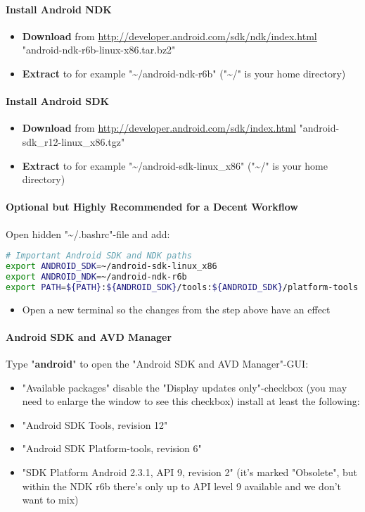 \paragraph{Install Android NDK}
\begin{itemize}
\item{\textbf{Download} from \url{http://developer.android.com/sdk/ndk/index.html} \textrightarrow  "android-ndk-r6b-linux-x86.tar.bz2"}
\item{\textbf{Extract} to for example "\textasciitilde /android-ndk-r6b" ("\textasciitilde /" is your home directory)}
\end{itemize}



\paragraph{Install Android SDK}
\begin{itemize}
\item{\textbf{Download} from \url{http://developer.android.com/sdk/index.html} \textrightarrow  "android-sdk\_r12-linux\_x86.tgz"}
\item{\textbf{Extract} to for example "\textasciitilde /android-sdk-linux\_x86" ("\textasciitilde /" is your home directory)}
\end{itemize}


\paragraph{Optional but Highly Recommended for a Decent Workflow}
Open hidden "\textasciitilde /.bashrc"-file and add:
\begin{lstlisting}[language=bash]
# Important Android SDK and NDK paths
export ANDROID_SDK=~/android-sdk-linux_x86
export ANDROID_NDK=~/android-ndk-r6b
export PATH=${PATH}:${ANDROID_SDK}/tools:${ANDROID_SDK}/platform-tools:~/${ANDROID_NDK}
\end{lstlisting}
\begin{itemize}
\item{Open a new terminal so the changes from the step above have an effect}
\end{itemize}


\paragraph{Android SDK and AVD Manager}
Type "\textbf{android}" to open the "Android SDK and AVD Manager"-GUI:
\begin{itemize}
\item{"Available packages" \textrightarrow  disable the "Display updates only"-checkbox (you may need to enlarge the window to see this checkbox) \textrightarrow  install at least the following:}
\item{"Android SDK Tools, revision 12"}
\item{"Android SDK Platform-tools, revision 6"}
\item{"SDK Platform Android 2.3.1, API 9, revision 2" (it's marked "Obsolete", but within the NDK r6b there's only up to API level 9 available and we don't want to mix)}
\end{itemize}




